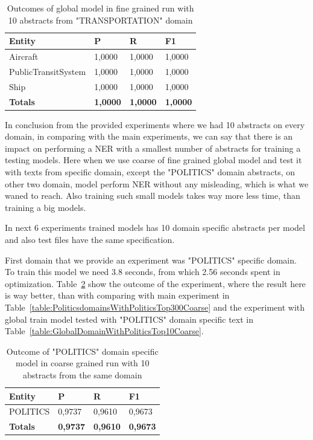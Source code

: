 \documentclass[thesis=M,english]{FITthesis}[2018/05/30]
\begin{document}
	\begin{table}[H]\centering
		\begin{tabular}{|l|l|l|l|}
			\hline {\textbf{Entity}} & {\textbf{P}} & {\textbf{R}} & {\textbf{F1}}\\\hline
				Aircraft & 1,0000 & 1,0000 & 1,0000\\
				PublicTransitSystem & 1,0000 & 1,0000 & 1,0000\\
				Ship & 1,0000 & 1,0000 & 1,0000\\\hline
				\textbf{Totals} & \textbf{1,0000} & \textbf{1,0000} & \textbf{1,0000}\\\hline
		\end{tabular}
		\caption{Outcomes of global model in fine grained run with 10 abstracts from "TRANSPORTATION" domain \label{table:GlobalDomainWithTransportationTop10Fine}}		
	\end{table}
	
	In conclusion from the provided experiments where we had 10 abstracts on every domain, in comparing with the main experiments, we can say that there is an impact on performing a NER with a smallest number of abstracts for training a testing models. Here when we use coarse of fine grained global model and test it with texts from specific domain, except the "POLITICS" domain abstracts, on other two domain, model perform NER without any misleading, which is what we waned to reach. Also training such small models takes way more less time, than training a big models. 
 
	In next 6 experiments trained models has 10 domain specific abstracts per model and also test files have the same specification.
	
	First domain that we provide an experiment was "POLITICS" specific domain. To train this model we need 3.8 seconds, from which 2.56 seconds spent in optimization. Table~\ref{table:PoliticsDomainWithPoliticsTop10Coarse} show the outcome of the experiment, where the result here is way better, than with comparing with main experiment in Table~\ref{table:PoliticsdomainsWithPoliticsTop300Coarse} and the experiment with global train model tested with "POLITICS" domain specific text in Table~\ref{table:GlobalDomainWithPoliticsTop10Coarse}.  

	\begin{table}[H]\centering
		\begin{tabular}{|l|l|l|l|}
			\hline {\textbf{Entity}} & {\textbf{P}} & {\textbf{R}} & {\textbf{F1}}\\\hline
				POLITICS & 0,9737 & 0,9610 & 0,9673\\\hline
				\textbf{Totals} & \textbf{0,9737} & \textbf{0,9610} & \textbf{0,9673}\\\hline
		\end{tabular}
		\caption{Outcome of "POLITICS" domain specific model in coarse grained run with 10 abstracts from the same domain \label{table:PoliticsDomainWithPoliticsTop10Coarse}}
	\end{table}	
	
\end{document}
